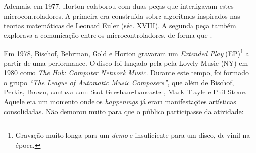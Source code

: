Ademais, em 1977, Horton colaborou com duas peças que interligavam estes microcontroladores. A primeira era construída sobre algoritmos inspirados nas teorias matemáticas de Leonard Euler (séc. XVIII). A segunda peça também explorava a comunicação entre os microcontroladores, de forma que .

Em 1978, Bischof, Behrman, Gold e Horton gravaram um \emph{Extended Play} (EP)\footnote{Gravação muito longa para um \emph{demo} e insuficiente para um disco, de vinil na época.} a partir de uma performance. O disco foi lançado pela pela Lovely Music (NY) em 1980 como \emph{The Hub: Computer Network Music}. Durante este tempo, foi formado o grupo \emph{``The League of Automatic Music Composers''}, que além de  Bischof, Perkis, Brown, contava com Scot Gresham-Lancaster, Mark Trayle e Phil Stone. Aquele era um momento onde os \emph{happenings} já eram manifestações artísticas consolidadas. Não demorou muito para que o público participasse da atividade:


